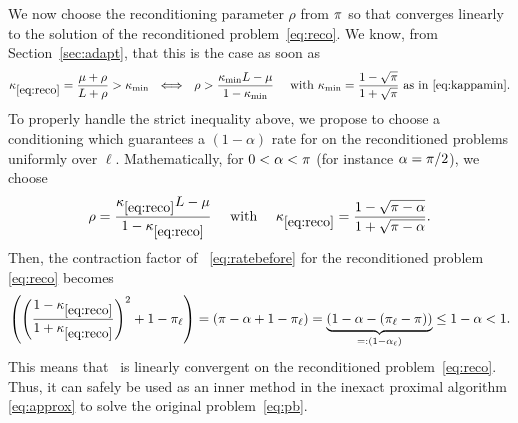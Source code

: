 We now choose the reconditioning parameter $\rho$ from $\pi$ so that \salgo converges linearly to the solution of the reconditioned problem~\eqref{eq:reco}. We know, from Section~\ref{sec:adapt}, that this is the case as soon as
\begin{align*}
   \kappa_{\eqref{eq:reco}} = \frac{\mu + \rho}{L+\rho}  > \kappa_{\min} ~~\Longleftrightarrow~~  \rho > \frac{\kappa_{\min}L-\mu}{1-\kappa_{\min}} \quad\text{ with } \kappa_{\min} = \frac{1-\sqrt{\pi}}{1+\sqrt{\pi}}
   \text{~as in~\eqref{eq:kappamin}}.
\end{align*}
To properly handle the strict inequality above, we propose to choose a conditioning which guarantees a $(1-\alpha)$ rate for \salgo on the reconditioned problems uniformly over $\ell$. Mathematically, for $0<\alpha<\pi$ (for instance $\alpha=\pi/2$), we choose
\begin{align}
\label{eq:rho}
    \rho = \frac{\kappa_{\eqref{eq:reco}} L-\mu}{1-\kappa_{\eqref{eq:reco}}} \quad\text{ with }\quad \kappa_{\eqref{eq:reco}} = \frac{1-\sqrt{\pi-\alpha}}{1+\sqrt{\pi-\alpha}} .
\end{align}
Then, the contraction factor of \salgo~\eqref{eq:ratebefore} for the reconditioned problem \eqref{eq:reco} becomes
\begin{align}
\label{eq:reco_contra}
     \left( \left(\frac{1-\kappa_{\eqref{eq:reco}}}{1+\kappa_{\eqref{eq:reco}}}\right)^2 + 1 - \pi_\ell  \right) =  \left( \pi - \alpha + 1 - \pi_\ell  \right) = \underbrace{(1 - \alpha - (\pi_\ell - \pi) )}_{=: (1-\alpha_\ell)} \leq 1-\alpha < 1 .
\end{align}
This means that \spyI~is linearly convergent on the reconditioned problem~\eqref{eq:reco}. Thus, it can safely be used as an inner method in the inexact proximal algorithm \eqref{eq:approx} to solve the original problem~\eqref{eq:pb}. 


